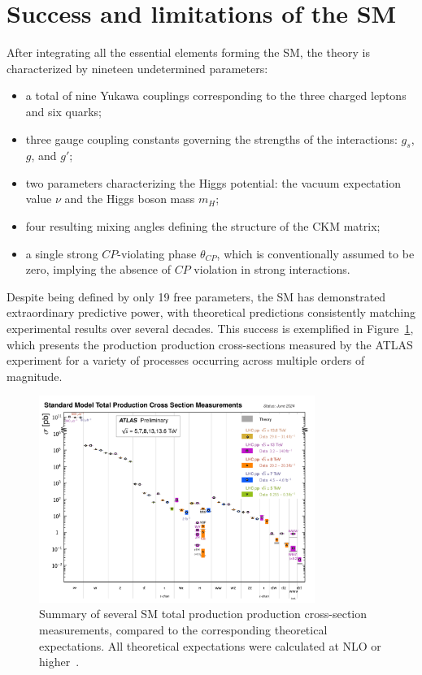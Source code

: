 \section{Success and limitations of the SM}
\label{sec:BSM}
After integrating all the essential elements forming the SM, the theory is characterized by nineteen undetermined parameters:
\begin{itemize}
  \item a total of nine Yukawa couplings corresponding to the three charged leptons and six quarks;
  \item three gauge coupling constants governing the strengths of the interactions: \( g_s \), \( g \), and \( g' \);
  \item two parameters characterizing the Higgs potential: the vacuum expectation value \(\nu\) and the Higgs boson mass \(m_H\);
  \item four resulting mixing angles defining the structure of the CKM matrix;
  \item a single strong $CP$-violating phase \(\theta_{CP}\), which is conventionally assumed to be zero, implying the absence of $CP$ violation in strong interactions.
\end{itemize}
Despite being defined by only 19 free parameters, the SM has demonstrated extraordinary predictive power, with theoretical predictions consistently matching experimental results over several decades. This success is exemplified in Figure~\ref{fig:totalxsect}, which presents the production production cross-sections measured by the ATLAS experiment for a variety of processes occurring across multiple orders of magnitude.
\begin{figure}[htbp]
  \centering
  \includegraphics[width=0.8\textwidth]{images/totalxsect.pdf}
  \caption{Summary of several SM total production production cross-section measurements, compared to the corresponding theoretical expectations. All theoretical expectations were calculated at NLO or higher~\cite{ATL-PHYS-PUB-2024-011}.}
  \label{fig:totalxsect}
\end{figure}

